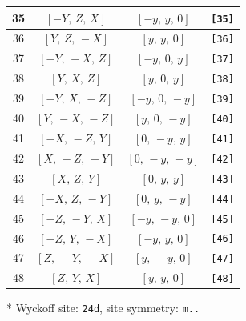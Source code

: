 \documentclass[fleqn,8pt]{jsarticle}
\begin{document}
\begin{longtable}{cccc}
35 & $\left[ - Y,\, Z,\, X \right]$ & $\left[ - y,\, y,\, 0 \right]$ & {\tt [35]} \\ \hline
36 & $\left[ Y,\, Z,\, - X \right]$ & $\left[ y,\, y,\, 0 \right]$ & {\tt [36]} \\ \hline
37 & $\left[ - Y,\, - X,\, Z \right]$ & $\left[ - y,\, 0,\, y \right]$ & {\tt [37]} \\ \hline
38 & $\left[ Y,\, X,\, Z \right]$ & $\left[ y,\, 0,\, y \right]$ & {\tt [38]} \\ \hline
39 & $\left[ - Y,\, X,\, - Z \right]$ & $\left[ - y,\, 0,\, - y \right]$ & {\tt [39]} \\ \hline
40 & $\left[ Y,\, - X,\, - Z \right]$ & $\left[ y,\, 0,\, - y \right]$ & {\tt [40]} \\ \hline
41 & $\left[ - X,\, - Z,\, Y \right]$ & $\left[ 0,\, - y,\, y \right]$ & {\tt [41]} \\ \hline
42 & $\left[ X,\, - Z,\, - Y \right]$ & $\left[ 0,\, - y,\, - y \right]$ & {\tt [42]} \\ \hline
43 & $\left[ X,\, Z,\, Y \right]$ & $\left[ 0,\, y,\, y \right]$ & {\tt [43]} \\ \hline
44 & $\left[ - X,\, Z,\, - Y \right]$ & $\left[ 0,\, y,\, - y \right]$ & {\tt [44]} \\ \hline
45 & $\left[ - Z,\, - Y,\, X \right]$ & $\left[ - y,\, - y,\, 0 \right]$ & {\tt [45]} \\ \hline
46 & $\left[ - Z,\, Y,\, - X \right]$ & $\left[ - y,\, y,\, 0 \right]$ & {\tt [46]} \\ \hline
47 & $\left[ Z,\, - Y,\, - X \right]$ & $\left[ y,\, - y,\, 0 \right]$ & {\tt [47]} \\ \hline
48 & $\left[ Z,\, Y,\, X \right]$ & $\left[ y,\, y,\, 0 \right]$ & {\tt [48]} \\
\end{longtable}
* Wyckoff site: {\tt 24d}, site symmetry: {\tt m..}
\renewcommand{\arraystretch}{1.2}
\end{document}

